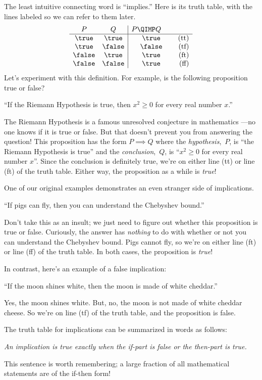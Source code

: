 The least intuitive connecting word is ``implies.''  Here is its truth
table, with the lines labeled so we can refer to them later.
%
\[
\begin{array}{cc|cr}
    P  &   Q    & \parbox[b]{13ex}{$P \QIMP Q$} \\ \hline
\true  & \true  & \true & \text{(tt)}\\
\true  & \false & \false  & \text{(tf)}\\
\false & \true  & \true  & \text{(ft)}\\
\false & \false & \true  & \text{(ff)}
\end{array}
\]
Let's experiment with this definition.  For example, is the following
proposition true or false?
\begin{center}
``If the Riemann Hypothesis is true, then $x^2 \geq 0$ for every real
number $x$.''
\end{center}
The Riemann Hypothesis is a famous unresolved conjecture in
mathematics ---no one knows if it is true or false.  But that
doesn't prevent you from answering the question!  This proposition has
the form $P \implies Q$ where the \emph{hypothesis},~$P$, is ``the
Riemann Hypothesis is true'' and the \emph{conclusion},~$Q$, is ``$x^2
\geq 0$ for every real number $x$''.  Since the conclusion is
definitely true, we're on either line (tt) or line (ft) of the truth
table.  Either way, the proposition as a while is \emph{true}!

One of our original examples demonstrates an even stranger side of
implications.
\begin{center}
``If pigs can fly, then you can understand the Chebyshev bound.''
\end{center}
Don't take this as an insult; we just need to figure out whether this
proposition is true or false.  Curiously, the answer has
\emph{nothing} to do with whether or not you can understand the
Chebyshev bound.  Pigs cannot fly, so we're on either line (ft) or
line (ff) of the truth table.  In both cases, the proposition is
\textit{true}!

In contrast, here's an example of a false implication:
%
\begin{center}
``If the moon shines white, then the moon is made of white cheddar.''
\end{center}
%
Yes, the moon shines white.  But, no, the moon is not made of white
cheddar cheese.  So we're on line (tf) of the truth table, and the
proposition is false.

The truth table for implications can be summarized in words as
follows:
%
\begin{center}
\textit{An implication is true exactly when the if-part is false or the
then-part is true.}
\end{center}
%
This sentence is worth remembering; a large fraction of all
mathematical statements are of the if-then form!

